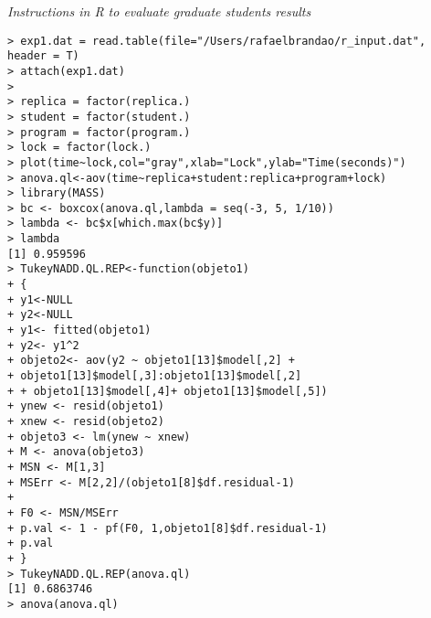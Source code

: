 \noindent
{\it Instructions in R to evaluate graduate students results}
\begin{verbatim}
> exp1.dat = read.table(file="/Users/rafaelbrandao/r_input.dat", header = T)
> attach(exp1.dat)
> 
> replica = factor(replica.)
> student = factor(student.)
> program = factor(program.)
> lock = factor(lock.)
> plot(time~lock,col="gray",xlab="Lock",ylab="Time(seconds)")
> anova.ql<-aov(time~replica+student:replica+program+lock)
> library(MASS)
> bc <- boxcox(anova.ql,lambda = seq(-3, 5, 1/10))
> lambda <- bc$x[which.max(bc$y)]
> lambda
[1] 0.959596
> TukeyNADD.QL.REP<-function(objeto1)
+ {
+ y1<-NULL
+ y2<-NULL
+ y1<- fitted(objeto1)
+ y2<- y1^2
+ objeto2<- aov(y2 ~ objeto1[13]$model[,2] +
+ objeto1[13]$model[,3]:objeto1[13]$model[,2]
+ + objeto1[13]$model[,4]+ objeto1[13]$model[,5])
+ ynew <- resid(objeto1)
+ xnew <- resid(objeto2)
+ objeto3 <- lm(ynew ~ xnew)
+ M <- anova(objeto3)
+ MSN <- M[1,3]
+ MSErr <- M[2,2]/(objeto1[8]$df.residual-1)
+ 
+ F0 <- MSN/MSErr
+ p.val <- 1 - pf(F0, 1,objeto1[8]$df.residual-1)
+ p.val
+ }
> TukeyNADD.QL.REP(anova.ql)
[1] 0.6863746
> anova(anova.ql)
\end{verbatim}

